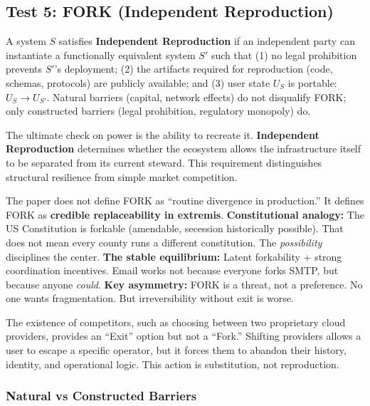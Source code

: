 \subsection{Test 5: FORK (Independent Reproduction)}

\begin{definition}[FORK]
\label{def:fork}
A system $S$ satisfies \textbf{Independent Reproduction} if an independent party can instantiate a functionally equivalent system $S'$ such that (1) no legal prohibition prevents $S'$'s deployment; (2) the artifacts required for reproduction (code, schemas, protocols) are publicly available; and (3) user state $U_S$ is portable: $U_S \to U_{S'}$. Natural barriers (capital, network effects) do not disqualify FORK; only constructed barriers (legal prohibition, regulatory monopoly) do.
\end{definition}

The ultimate check on power is the ability to recreate it. \textbf{Independent Reproduction} determines whether the ecosystem allows the infrastructure itself to be separated from its current steward. This requirement distinguishes structural resilience from simple market competition.

\begin{remark}
The paper does not define FORK as ``routine divergence in production.'' It defines FORK as \textbf{credible replaceability in extremis}. \textbf{Constitutional analogy:} The US Constitution is forkable (amendable, secession historically possible). That does not mean every county runs a different constitution. The \textit{possibility} disciplines the center. \textbf{The stable equilibrium:} Latent forkability + strong coordination incentives. Email works not because everyone forks SMTP, but because anyone \textit{could}. \textbf{Key asymmetry:} FORK is a threat, not a preference. No one wants fragmentation. But irreversibility without exit is worse.
\end{remark}

The existence of competitors, such as choosing between two proprietary cloud providers, provides an ``Exit'' option but not a ``Fork.'' Shifting providers allows a user to escape a specific operator, but it forces them to abandon their history, identity, and operational logic. This action is substitution, not reproduction.

\subsubsection{Natural vs Constructed Barriers}


